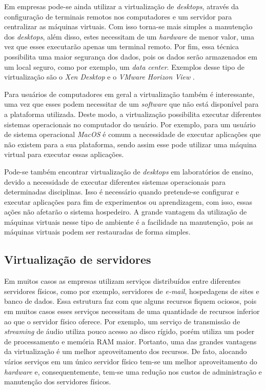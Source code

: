 Em empresas pode-se ainda utilizar a virtualização de \textit{desktops}, através da configuração de terminais remotos nos computadores e um 
servidor para centralizar as máquinas virtuais. Com isso torna-se mais simples a manutenção dos \textit{desktops}, além disso, estes necessitam 
de um \textit{hardware} de menor valor, uma vez que esses executarão apenas um terminal remoto. Por fim, essa técnica possibilita uma maior 
segurança dos dados, pois os dados serão armazenados em um local seguro, como por exemplo, um \textit{data center}. Exemplos desse tipo de 
virtualização são o \textit{Xen Desktop} \cite{xendesktop} e o \textit{VMware Horizon View} \cite{vmwareview}.

Para usuários de computadores em geral a virtualização também é interessante, uma vez que esses podem necessitar de um \textit{software} que não
está disponível para a plataforma utilizada. Deste modo, a virtualização possibilita executar diferentes sistemas operacionais no computador do 
usuário. Por exemplo, para um usuário de sistema operacional \textit{MacOS} é comum a necessidade de executar aplicações que não existem para a 
sua plataforma, sendo assim esse pode utilizar uma máquina virtual para executar essas aplicações.

Pode-se também encontrar virtualização de \textit{desktops} em laboratórios de ensino, devido a necessidade de executar diferentes sistemas 
operacionais para determinadas disciplinas. Isso é necessário quando pretende-se configurar e executar aplicações para fim de experimentos ou
aprendizagem, com isso, essas ações não afetarão o sistema hospedeiro. A grande vantagem da utilização de máquinas virtuais nesse tipo de 
ambiente é a facilidade na manutenção, pois as máquinas virtuais podem ser restauradas de forma simples.

\subsection{Virtualização de servidores}
\label{section:virtdesk}

Em muitos casos as empresas utilizam serviços distribuídos entre diferentes servidores físicos, como por exemplo, servidores de \textit{e-mail}, 
hospedagens de sites e banco de dados. Essa estrutura faz com que alguns recursos fiquem ociosos, pois em muitos casos esses serviços necessitam 
de uma quantidade de recursos inferior ao que o servidor físico oferece. Por exemplo, um serviço de transmissão de \textit{streaming} de áudio 
utiliza pouco acesso ao disco rígido, porém utiliza um poder de processamento e memória RAM maior. Portanto, uma das grandes vantagens da 
virtualização é um melhor aproveitamento dos recursos. De fato, alocando vários serviços em um único servidor físico tem-se um melhor 
aproveitamento do \textit{hardware} \cite{moreira2006} e, consequentemente, tem-se uma redução nos custos de administração e manutenção 
dos servidores físicos.

